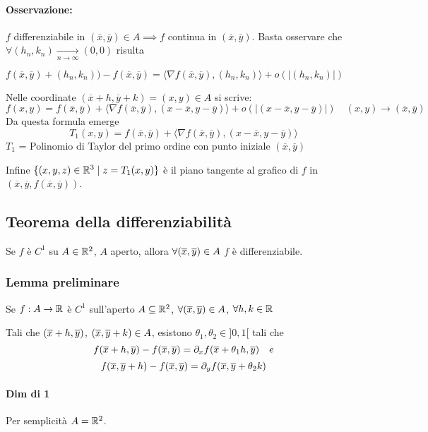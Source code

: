 \documentclass[a4paper]{article}
\begin{document}
\paragraph{Osservazione:} $f$ differenziabile in $(\overline x, \overline y) \in A \implies f$ continua in $(\overline x, \overline y)$.
		Basta osservare che $\forall (h_n,k_n) \xrightarrow[n \to \infty]{} (0,0)$ risulta 

		$f(\overline x, \overline y)+(h_n,k_n))-f(\overline x, \overline y) = \langle \nabla f (\overline x, \overline y),(h_n,k_n) \rangle + o(|(h_n,k_n)|)$

Nelle coordinate $ (\overline x+h, \overline y+k)=(x,y) \in A $ si scrive:
$$
f(x,y) = f(\overline x, \overline y)+\langle \nabla f (\overline x, \overline y), (x-\overline x, y-\overline y) \rangle + o (|(x-\overline x, y-\overline y)|) \quad (x,y) \to (\overline x, \overline y)
$$
Da questa formula emerge
$$
T_1(x,y) = f(\overline x, \overline y)+\langle \nabla f (\overline x, \overline y), (x-\overline x, y-\overline y) \rangle
$$
$T_1$ = Polinomio di Taylor del primo ordine con punto iniziale $(\overline x, \overline y)$

Infine $\{(x,y,z)\in \mathbb{R}^3 \mid z = T_1(x,y)\}$ è il piano tangente al grafico di $f$ in $(\overline x, \overline y,f(\overline x, \overline y))$.

\subsection{Teorema della differenziabilità}
\begin{center}
Se $f$ è $C^1$ su $A \in \mathbb{R}^2$, $A$ aperto, allora $\forall (\overline{x},\overline{y}) \in A$ $f$ è differenziabile.
\end{center}

\subsubsection{Lemma preliminare}
Se $f:A \to \mathbb{R}$ è $C^1$ sull'aperto $A \subseteq \mathbb{R}^2$, $\forall (\overline{x},\overline{y}) \in A$, $\forall h,k \in \mathbb{R}$

Tali che $(\overline{x} +h , \overline{y})$, $(\overline{x}, \overline{y}+k) \in A$, esistono $\theta _1, \theta _2 \in ]0,1[$ tali che 
$$
f(\overline{x}+h, \overline{y}) - f(\overline{x}, \overline{y}) = \partial_x f (\overline{x} + \theta_1 h , \overline{y}) \quad e
$$$$
f(\overline{x},\overline{y} +h) - f(\overline{x}, \overline{y}) = \partial_y f (\overline{x}, \overline{y} + \theta_2 k)
$$

\paragraph { Dim di 1 }
Per semplicità $A = \mathbb{R} ^2$.
\end{document}
